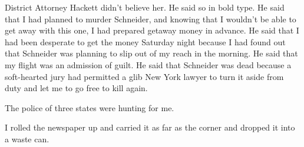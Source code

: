 \documentclass{novel}
\begin{document}
{District Attorney Hackett didn’t believe her. He said so in bold type. He said that I had planned to murder Schneider, and knowing that I wouldn’t be able to get away with this one, I had prepared getaway money in advance. He said that I had been desperate to get the money Saturday night because I had found out that Schneider was planning to slip out of my reach in the morning. He said that my flight was an admission of guilt. He said that Schneider was dead because a soft-hearted jury had permitted a glib New York lawyer to turn it aside from duty and let me to go free to kill again.

The police of three states were hunting for me.

I rolled the newspaper up and carried it as far as the corner and dropped it into a waste can.

}

\vspace{2\nbs}
\clearpage
\thispagestyle{empty}
\end{document}
